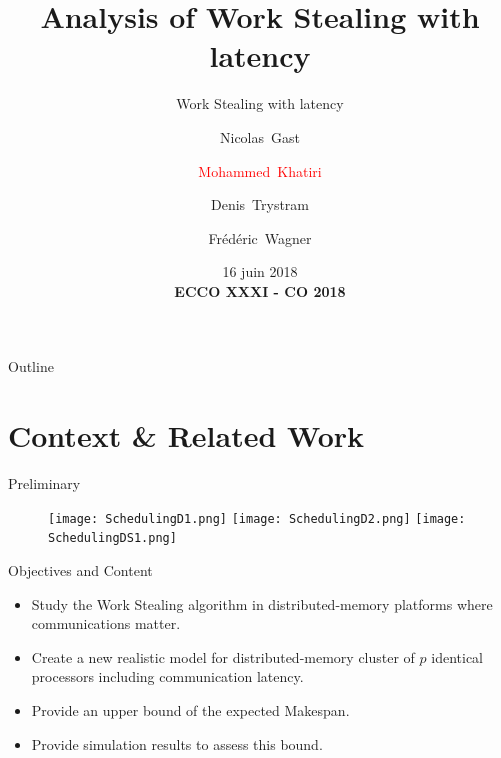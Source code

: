 \documentclass{beamer}
\title{Analysis of Work Stealing with latency}
\subtitle{Work Stealing with latency}
\author{Nicolas~Gast\inst{1} \and \textcolor{red}{Mohammed~Khatiri}\inst{1}\inst{2} \and Denis~Trystram\inst{1} \and Fr\'ed\'eric~Wagner\inst{1}}
\institute[Univ. Grenoble Alpes, CNRS, Inria, LIG] %
{
    \inst{1}%
  Univ. Grenoble Alpes, France
  \and
  \inst{2}%
  University Mohammed First, Morocco}
\date{16 juin 2018 \\ \textbf{ECCO XXXI - CO 2018}}
\begin{document}
\begin{frame}
    \titlepage
\end{frame}

\begin{frame}{Outline}
    \tableofcontents
\end{frame}

\section{Context \& Related Work}

\begin{frame}{Preliminary}
    \begin{figure}
    \begin{center}
    \end{center}
    \end{figure}

       \begin{center}
        \end{center}
    \begin{figure}
    \begin{center}
         {\texttt{[image: SchedulingD1.png]}}
         {\texttt{[image: SchedulingD2.png]}}
         {\texttt{[image: SchedulingDS1.png]}}
    \end{center}
    \end{figure}


\end{frame}


\begin{frame}{Objectives and Content}
    \begin{itemize}%
        \item {
               Study the Work Stealing algorithm in distributed-memory platforms where communications matter. 
            }
        \item {

               Create a new realistic model for distributed-memory cluster of $p$ identical processors including communication latency. 
            }
        \item {
                Provide an upper bound of the expected Makespan.
            }
        \item {
               Provide simulation results to assess this bound. 
            }
    \end{itemize}
\end{frame}
\end{document}
